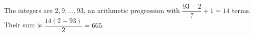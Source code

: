 The integers are $2,9,\ldots,93$, an arithmetic progression with $\dfrac{93-2}{7}+1=14$ terms. Their sum is $\dfrac{14(2+93)}{2}=\boxed{665}$.
